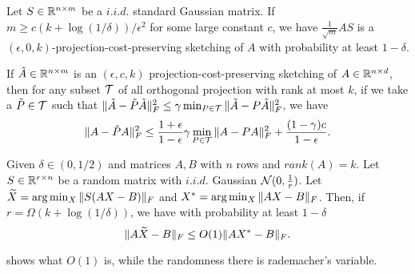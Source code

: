 \begin{thm}
    \label{proj_preserve_sk}
    Let $S\in\mathbb{R}^{n\times m}$ be a $i.i.d.$ standard Gaussian matrix. If $m\ge c(k+\log(1/\delta))/\epsilon^2$ for some large constant $c$, we have $\frac{1}{\sqrt{m}}AS$
    is a $(\epsilon,0,k)$-projection-cost-preserving sketching of $A$ with probability at least $1-\delta$.
\end{thm}
\pfsk{\ref{proj_preserve_sk}}{

}

\begin{thm}
    \label{proj_preserve_thm}
    If  $\tilde{A}\in\mathbb{R}^{n\times m}$ is an $(\epsilon,c,k)$ projection-cost-preserving sketching of $A\in\mathbb{R}^{n\times d}$, then for any subset $\mathcal{T}$ of all
    orthogonal projection with rank at most $k$, if we take a $\tilde{P}\in\mathcal{T}$ such that $\|\tilde{A}-\tilde{P}\tilde{A}\|_F^2\le\gamma\min_{P\in\mathcal{T}}\|\tilde{A}-P\tilde{A}\|_F^2$,
    we have
    \[
    \|A-\tilde{P} A\|_F^2\le \frac{1+\epsilon}{1-\epsilon}\gamma\min_{P\in\mathcal{T}}\|A-PA\|_F^2+\frac{(1-\gamma)c}{1-\epsilon}.    
    \]
\end{thm}

\begin{thm}
    \label{regress_sketch}
    Given $\delta\in(0,1/2)$ and matrices $A,B$ with $n$ rows and $rank(A)=k$. Let $S\in\mathbb{R}^{r\times n}$ be a random matrix with $i.i.d.$ Gaussian $\mathcal{N}(0,\frac{1}{r})$.
    Let $\widetilde{X}=\arg\min_X\|S(AX-B)\|_F$ and $X^*=\arg\min_X\|AX-B\|_F$. Then, if $r=\Omega(k+\log(1/\delta))$, we have with probability at least $1-\delta$
    \[
    \|A\widetilde{X}-B\|_F\le O(1)\|AX^*-B\|_F.    
    \]
\end{thm}
\begin{rmk}
\cite{cw09} shows what $O(1)$ is, while the randomness there is rademacher's variable.
\end{rmk}

\pfsk{\ref{regress_sketch}}{

}

